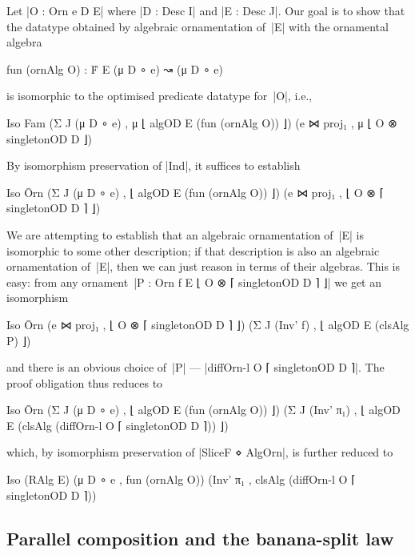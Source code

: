 Let |O : Orn e D E| where |D : Desc I| and |E : Desc J|.
Our goal is to show that the datatype obtained by algebraic ornamentation of~|E| with the ornamental algebra
\begin{code}
fun (ornAlg O) : Ḟ E (μ D ∘ e) ↝ (μ D ∘ e)
\end{code}
is isomorphic to the optimised predicate datatype for~|O|, i.e.,
\begin{code}
Iso Fam  (Σ J (μ D ∘ e)  , μ ⌊ algOD E (fun (ornAlg O)) ⌋)
         (e ⋈ proj₁      , μ ⌊ O ⊗ singletonOD D ⌋)
\end{code}
By isomorphism preservation of |Ind|, it suffices to establish
\begin{code}
Iso Ōrn  (Σ J (μ D ∘ e)  , ⌊ algOD E (fun (ornAlg O)) ⌋)
         (e ⋈ proj₁      , ⌊ O ⊗ ⌈ singletonOD D ⌉ ⌋)
\end{code}
We are attempting to establish that an algebraic ornamentation of~|E| is isomorphic to some other description; if that description is also an algebraic ornamentation of~|E|, then we can just reason in terms of their algebras.
This is easy: from any ornament~|P : Orn f E ⌊ O ⊗ ⌈ singletonOD D ⌉ ⌋| we get an isomorphism 
\begin{code}
Iso Ōrn  (e ⋈ proj₁     , ⌊ O ⊗ ⌈ singletonOD D ⌉ ⌋)
         (Σ J (Inv' f)  , ⌊ algOD E (clsAlg P) ⌋)
\end{code}
and there is an obvious choice of~|P| --- |diffOrn-l O ⌈ singletonOD D ⌉|.
The proof obligation thus reduces to
\begin{code}
Iso Ōrn  (Σ J (μ D ∘ e)  , ⌊ algOD E (fun (ornAlg O)) ⌋)
         (Σ J (Inv' π₁)  , ⌊ algOD E (clsAlg (diffOrn-l O ⌈ singletonOD D ⌉)) ⌋)
\end{code}
which, by isomorphism preservation of |SliceF ⋄ AlgOrn|, is further reduced to
\begin{code}
Iso (RAlg E)  (μ D ∘ e  , fun (ornAlg O))
              (Inv' π₁  , clsAlg (diffOrn-l O ⌈ singletonOD D ⌉))
\end{code}



\begin{code}

\end{code}

\subsection{Parallel composition and the banana-split law}
\label{sec:banana-split}


